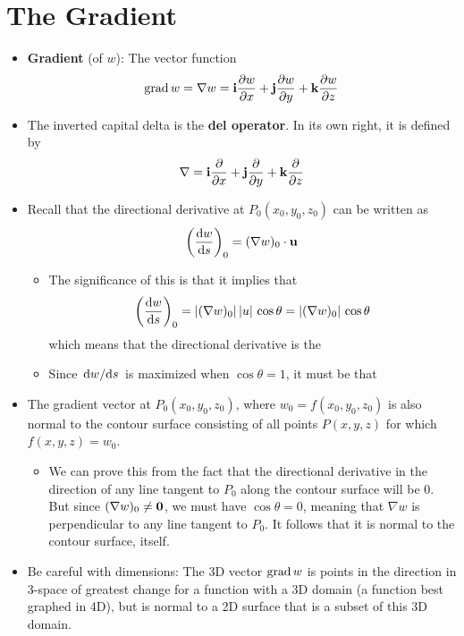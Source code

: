 \documentclass[../main.tex]{subfiles}
\begin{document}
\section{The Gradient}
\begin{itemize}
    \item \textbf{Gradient} (of $w$): The vector function
    \begin{equation*}
        \operatorname{grad} w = \nabla w = \vb{i}\pdv{w}{x}+\vb{j}\pdv{w}{y}+\vb{k}\pdv{w}{z}
    \end{equation*}
    \item The inverted capital delta is the \textbf{del operator}. In its own right, it is defined by
    \begin{equation*}
        \nabla = \vb{i}\pdv{x}+\vb{j}\pdv{y}+\vb{k}\pdv{z}
    \end{equation*}
    \item Recall that the directional derivative at $P_0(x_0,y_0,z_0)$ can be written as
    \begin{equation*}
        \left( \dv{w}{s} \right)_0 = (\nabla w)_0\cdot\vb{u}
    \end{equation*}
    \begin{itemize}
        \item The significance of this is that it implies that
        \begin{equation*}
            \left( \dv{w}{s} \right)_0 = |(\nabla w)_0|\, |u|\, \cos\theta = |(\nabla w)_0|\, \cos\theta
        \end{equation*}
        which means that the directional derivative is the 
        \item Since $\dv*{w}{s}$ is maximized when $\cos\theta=1$, it must be that 
    \end{itemize}
    \item The gradient vector at $P_0(x_0,y_0,z_0)$, where $w_0=f(x_0,y_0,z_0)$ is also normal to the contour surface consisting of all points $P(x,y,z)$ for which $f(x,y,z)=w_0$.
    \begin{itemize}
        \item We can prove this from the fact that the directional derivative in the direction of any line tangent to $P_0$ along the contour surface will be 0. But since $(\nabla w)_0\neq\vb{0}$, we must have $\cos\theta=0$, meaning that $\nabla w$ is perpendicular to any line tangent to $P_0$. It follows that it is normal to the contour surface, itself.
    \end{itemize}
    \item Be careful with dimensions: The 3D vector $\operatorname{grad} w$ is points in the direction in 3-space of greatest change for a function with a 3D domain (a function best graphed in 4D), but is normal to a 2D surface that is a subset of this 3D domain.
\end{itemize}
\end{document}
